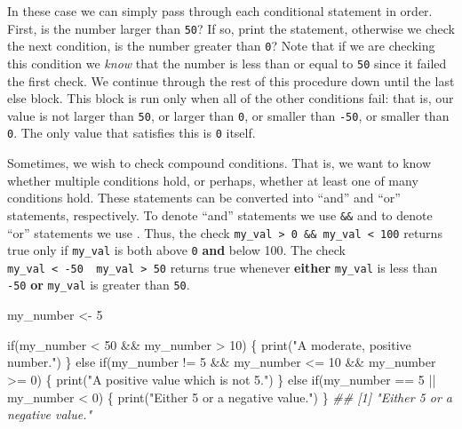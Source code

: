 \documentclass[
  letterpaper,
  DIV=11,
  numbers=noendperiod]{scrreprt}
\newenvironment{Shaded}{\begin{snugshade}}{\end{snugshade}}
\newcommand{\ControlFlowTok}[1]{\textcolor[rgb]{0.00,0.23,0.31}{#1}}
\newcommand{\DecValTok}[1]{\textcolor[rgb]{0.68,0.00,0.00}{#1}}
\newcommand{\DocumentationTok}[1]{\textcolor[rgb]{0.37,0.37,0.37}{\textit{#1}}}
\newcommand{\FunctionTok}[1]{\textcolor[rgb]{0.28,0.35,0.67}{#1}}
\newcommand{\NormalTok}[1]{\textcolor[rgb]{0.00,0.23,0.31}{#1}}
\newcommand{\OtherTok}[1]{\textcolor[rgb]{0.00,0.23,0.31}{#1}}
\newcommand{\SpecialCharTok}[1]{\textcolor[rgb]{0.37,0.37,0.37}{#1}}
\newcommand{\StringTok}[1]{\textcolor[rgb]{0.13,0.47,0.30}{#1}}
\theoremstyle{definition}
\theoremstyle{definition}
\theoremstyle{definition}
\theoremstyle{remark}
\begin{document}
In these case we can simply pass through each conditional statement in
order. First, is the number larger than \texttt{50}? If so, print the
statement, otherwise we check the next condition, is the number greater
than \texttt{0}? Note that if we are checking this condition we
\emph{know} that the number is less than or equal to \texttt{50} since
it failed the first check. We continue through the rest of this
procedure down until the last else block. This block is run only when
all of the other conditions fail: that is, our value is not larger than
\texttt{50}, or larger than \texttt{0}, or smaller than \texttt{-50}, or
smaller than \texttt{0}. The only value that satisfies this is
\texttt{0} itself.

Sometimes, we wish to check compound conditions. That is, we want to
know whether multiple conditions hold, or perhaps, whether at least one
of many conditions hold. These statements can be converted into ``and''
and ``or'' statements, respectively. To denote ``and'' statements we use
\texttt{\&\&} and to denote ``or'' statements we use
\texttt{\textbar{}\textbar{}}. Thus, the check
\texttt{my\_val\ \textgreater{}\ 0\ \&\&\ my\_val\ \textless{}\ 100}
returns true only if \texttt{my\_val} is both above \texttt{0}
\textbf{and} below 100. The check
\texttt{my\_val\ \textless{}\ -50\ \textbar{}\textbar{}\ my\_val\ \textgreater{}\ 50}
returns true whenever \textbf{either} \texttt{my\_val} is less than
\texttt{-50} \textbf{or} \texttt{my\_val} is greater than \texttt{50}.

\begin{Shaded}
\begin{Highlighting}[]
\NormalTok{my\_number }\OtherTok{\textless{}{-}} \DecValTok{5}

\ControlFlowTok{if}\NormalTok{(my\_number }\SpecialCharTok{\textless{}} \DecValTok{50} \SpecialCharTok{\&\&}\NormalTok{ my\_number }\SpecialCharTok{\textgreater{}} \DecValTok{10}\NormalTok{) \{}
    \FunctionTok{print}\NormalTok{(}\StringTok{"A moderate, positive number."}\NormalTok{)}
\NormalTok{\} }\ControlFlowTok{else} \ControlFlowTok{if}\NormalTok{(my\_number }\SpecialCharTok{!=} \DecValTok{5} \SpecialCharTok{\&\&}\NormalTok{ my\_number }\SpecialCharTok{\textless{}=} \DecValTok{10} \SpecialCharTok{\&\&}\NormalTok{ my\_number }\SpecialCharTok{\textgreater{}=} \DecValTok{0}\NormalTok{) \{}
    \FunctionTok{print}\NormalTok{(}\StringTok{"A positive value which is not 5."}\NormalTok{)}
\NormalTok{\} }\ControlFlowTok{else} \ControlFlowTok{if}\NormalTok{(my\_number }\SpecialCharTok{==} \DecValTok{5} \SpecialCharTok{||}\NormalTok{ my\_number }\SpecialCharTok{\textless{}} \DecValTok{0}\NormalTok{) \{}
    \FunctionTok{print}\NormalTok{(}\StringTok{"Either 5 or a negative value."}\NormalTok{)}
\NormalTok{\}}
\DocumentationTok{\#\# [1] "Either 5 or a negative value."}
\end{Highlighting}
\end{Shaded}
\end{document}
